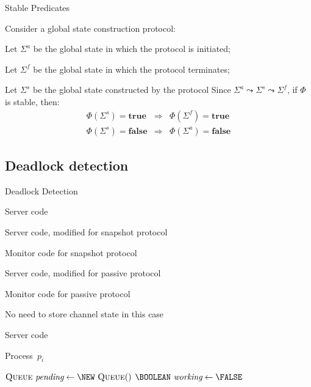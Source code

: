 \begin{frame}{Stable Predicates}

Consider a global state construction protocol:
\BI
\item Let $\Sigma^a$ be the global state in which the protocol is initiated;
\item Let $\Sigma^f$ be the global state in which the protocol terminates;
\item Let $\Sigma^s$ be the global state constructed by the protocol
\EI
Since $\Sigma^a \leadsto \Sigma^s \leadsto \Sigma^f$, if $\Phi$ is stable, then:
\begin{eqnarray*}
\Phi(\Sigma^s) = \mathbf{true} &\Rightarrow& \Phi(\Sigma^f) = \mathbf{true} \\
\Phi(\Sigma^s) = \mathbf{false} &\Rightarrow& \Phi(\Sigma^a) = \mathbf{false}
\end{eqnarray*}

\end{frame}

\subsection{Deadlock detection}

\begin{frame}{Deadlock Detection}

\BI 
\item Server code
\item Server code, modified for snapshot protocol
\item Monitor code for snapshot protocol
\item Server code, modified for passive protocol
\item Monitor code for passive protocol
\EI

\BI
\item No need to store channel state in this case
\EI

\end{frame}


\begin{frame}[shrink=16]{Server code}

\vspace{-12pt}
\begin{Procedure}
\caption{Process\ $p_i$}
  $\Queue\ \Pending \gets \NEW\ \Queue()$\;
  $\BOOLEAN\ \Working \gets \FALSE$\;
\end{Procedure}

\end{frame}

